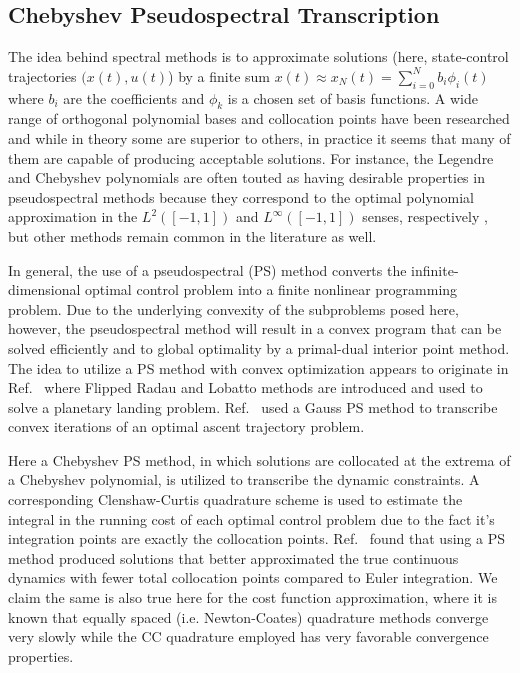 \documentclass[10pt,a4paper]{article}
\begin{document}
	
	\subsection{Chebyshev Pseudospectral Transcription}
	The idea behind spectral methods is to approximate solutions (here, state-control trajectories $ (x(t),u(t) $) by a finite sum $x(t) \approx x_N(t) = \sum_{i=0}^{N}b_i\phi_i(t)$ where $b_i$ are the coefficients and $ {\phi_k} $ is a chosen set of basis functions. A wide range of orthogonal polynomial bases and collocation points have been researched \cite{ChebyPS,LegendrePS,RadauPS,GPOPS} and while in theory some are superior to others, in practice it seems that many of them are capable of producing acceptable solutions. For instance, the Legendre and Chebyshev polynomials are often touted as having desirable properties in pseudospectral methods because they correspond to the optimal polynomial approximation in the $L^2([-1,1])$ and $L^\infty([-1,1])$ senses, respectively \cite{Polynomials}, but other methods remain common in the literature as well.
	
	In general, the use of a pseudospectral (PS) method converts the infinite-dimensional optimal control problem into a finite nonlinear programming problem. Due to the underlying convexity of the subproblems posed here, however, the pseudospectral method will result in a convex program that can be solved efficiently and to global optimality by a primal-dual interior point method. The idea to utilize a PS method with convex optimization appears to originate in Ref.~\cite{PS_Convex} where Flipped Radau and Lobatto methods are introduced and used to solve a planetary landing problem. Ref.~\cite{PS_Convex_ascent} used a Gauss PS method to transcribe convex iterations of an optimal ascent trajectory problem. 
	
	Here a Chebyshev PS method, in which solutions are collocated at the extrema of a Chebyshev polynomial, is utilized to transcribe the dynamic constraints. A corresponding Clenshaw-Curtis quadrature scheme is used to estimate the integral in the running cost of each optimal control problem due to the fact it's integration points are exactly the collocation points.\cite{CCQuad} Ref.~\cite{PS_Convex} found that using a PS method produced solutions that better approximated the true continuous dynamics with fewer total collocation points compared to Euler integration. We claim the same is also true here for the cost function approximation, where it is known that equally spaced (i.e. Newton-Coates) quadrature methods converge very slowly while the CC quadrature employed has very favorable convergence properties.
	
\end{document}
